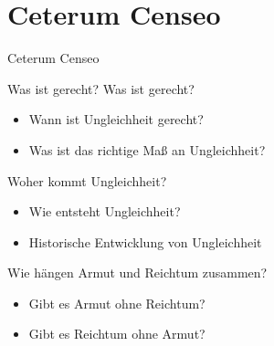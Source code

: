 \documentclass[aspectratio=169,xcolor=dvipsnames]{beamer}
\begin{document}
\section{Ceterum Censeo}

\begin{frame}[plain,c]
    \begin{center}
    \color{DarkBlue}
        Ceterum Censeo
    \end{center}
\end{frame}


\begin{frame}[label = was-ist-gerecht]{Was ist gerecht?}
    Was ist gerecht? \hyperlink{meinungen-zu-ungleichheit}{}
    \begin{itemize}
        \item Wann ist Ungleichheit gerecht?
        \item Was ist das richtige Maß an Ungleichheit?
    \end{itemize}

    \vspace{0.5cm}
    \pause
    Woher kommt Ungleichheit?
    \begin{itemize}
        \item Wie entsteht Ungleichheit? \hyperlink{meinungen-zu-ungleichheit}{}
        \item Historische Entwicklung von Ungleichheit
        \hyperlink{timeline_income}{} \hyperlink{timeline_wealth}{}
        \hyperlink{within-between-ineq}{}
    \end{itemize}
    
    \vspace{0.5cm}
    \pause    
    Wie hängen Armut und Reichtum zusammen? \hyperlink{arm-und-reich}{}
    \begin{itemize}
        \item Gibt es Armut ohne Reichtum?
        \item Gibt es Reichtum ohne Armut?
    \end{itemize}
\end{frame}
\end{document}
